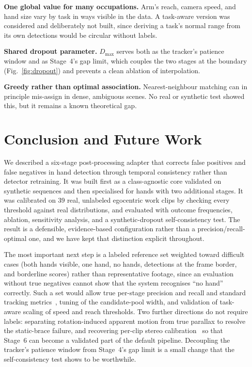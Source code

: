 \documentclass[journal]{IEEEtran}
\begin{document}
\textbf{One global value for many occupations.} Arm's reach, camera speed, and hand size vary by task in ways visible in the data. A task-aware version was considered and deliberately not built, since deriving a task's normal range from its own detections would be circular without labels.

\textbf{Shared dropout parameter.} $D_{\max}$ serves both as the tracker's patience window and as Stage~4's gap limit, which couples the two stages at the boundary (Fig.~\ref{fig:dropout}) and prevents a clean ablation of interpolation.

\textbf{Greedy rather than optimal association.} Nearest-neighbour matching can in principle mis-assign in dense, ambiguous scenes. No real or synthetic test showed this, but it remains a known theoretical gap.

\section{Conclusion and Future Work}
We described a six-stage post-processing adapter that corrects false positives and false negatives in hand detection through temporal consistency rather than detector retraining. It was built first as a class-agnostic core validated on synthetic sequences and then specialised for hands with two additional stages. It was calibrated on 39 real, unlabeled egocentric work clips by checking every threshold against real distributions, and evaluated with outcome frequencies, ablation, sensitivity analysis, and a synthetic-dropout self-consistency test. The result is a defensible, evidence-based configuration rather than a precision/recall-optimal one, and we have kept that distinction explicit throughout.

The most important next step is a labeled reference set weighted toward difficult cases (both hands visible, one hand, no hands, detections at the frame border, and borderline scores) rather than representative footage, since an evaluation without true negatives cannot show that the system recognises ``no hand'' correctly. Such a set would allow true per-stage precision and recall and standard tracking metrics~\cite{bernardin2008clear,ristani2016idf1,luiten2021hota}, tuning of the candidate-pool width, and validation of task-aware scaling of speed and reach thresholds. Two further directions do not require labels: separating rotation-induced apparent motion from true parallax to resolve the static-brace failure, and recovering per-clip stereo calibration~\cite{zhang2000calibration} so that Stage~6 can become a validated part of the default pipeline. Decoupling the tracker's patience window from Stage~4's gap limit is a small change that the self-consistency test shows to be worthwhile.
\end{document}
